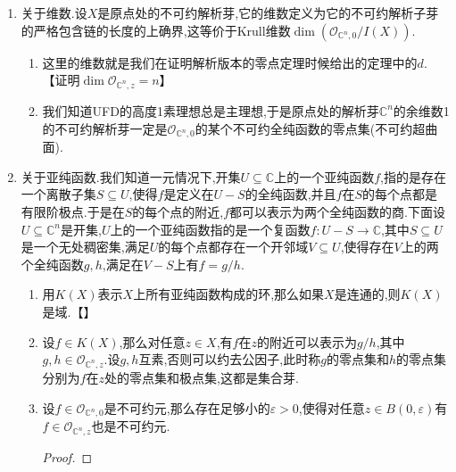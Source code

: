 \begin{enumerate}
\begin{proof}
    	\qquad
    	
    	任取$f\in I(Z(\mathfrak{p}))$,我们要证明的是$f\in\mathfrak{p}$.按照上面提到的定理,在适当选取坐标之后(换句话讲在做一个全纯等价之后),可以要求$f$在$\mathscr{O}_{\mathbb{C}^n,0}/\mathfrak{p}$中的像$\widetilde{f}$满足一个$\mathscr{O}_{\mathbb{C}^d,0}$系数的不可约首一多项式$\widetilde{f}^k+a_1(w)\widetilde{f}^{k-1}+\cdots+a_k(w)=0$,其中$w=(z_{n-d+1},\cdots,z_n)$.由于$f$在$Z(\mathfrak{p})$上处处取零,于是这里$a_k(w)$也在$Z(\mathfrak{p})$上处处取零,但是按照上面定理有$Z(\mathfrak{p})\to\mathbb{C}^d$是芽的满射,所以在原点足够小的附近有$a_k(w)\equiv0$.在$k\ge2$时这件事和$\widetilde{f}$满足不可约首一多项式矛盾,所以只能有$k=1$,也即$\widetilde{f}=0$,也即$f\in\mathfrak{p}$.
    \end{proof}
    \item 关于维数.设$X$是原点处的不可约解析芽,它的维数定义为它的不可约解析子芽的严格包含链的长度的上确界,这等价于Krull维数$\dim(\mathscr{O}_{\mathbb{C}^n,0}/I(X))$.
    \begin{enumerate}[(1)]
    	\item 这里的维数就是我们在证明解析版本的零点定理时候给出的定理中的$d$.【证明$\dim\mathscr{O}_{\mathbb{C}^n,z}=n$】
    	\item 我们知道UFD的高度1素理想总是主理想,于是原点处的解析芽$\mathbb{C}^n$的余维数1的不可约解析芽一定是$\mathscr{O}_{\mathbb{C}^n,0}$的某个不可约全纯函数的零点集(不可约超曲面).
    \end{enumerate}
    \item 关于亚纯函数.我们知道一元情况下,开集$U\subseteq\mathbb{C}$上的一个亚纯函数$f$,指的是存在一个离散子集$S\subseteq U$,使得$f$是定义在$U-S$的全纯函数,并且$f$在$S$的每个点都是有限阶极点.于是在$S$的每个点的附近,$f$都可以表示为两个全纯函数的商.下面设$U\subseteq\mathbb{C}^n$是开集,$U$上的一个亚纯函数指的是一个复函数$f:U-S\to\mathbb{C}$,其中$S\subseteq U$是一个无处稠密集,满足$U$的每个点都存在一个开邻域$V\subseteq U$,使得存在$V$上的两个全纯函数$g,h$,满足在$V-S$上有$f=g/h$.
    \begin{enumerate}[(1)]
    	\item 用$K(X)$表示$X$上所有亚纯函数构成的环,那么如果$X$是连通的,则$K(X)$是域.【】
    	\item 设$f\in K(X)$,那么对任意$z\in X$,有$f$在$z$的附近可以表示为$g/h$,其中$g,h\in\mathscr{O}_{\mathbb{C}^n,z}$.设$g,h$互素,否则可以约去公因子,此时称$g$的零点集和$h$的零点集分别为$f$在$z$处的零点集和极点集,这都是集合芽.
    	\item 设$f\in\mathscr{O}_{\mathbb{C}^n,0}$是不可约元,那么存在足够小的$\varepsilon>0$,使得对任意$z\in B(0,\varepsilon)$有$f\in\mathscr{O}_{\mathbb{C}^n,z}$也是不可约元.
    	\begin{proof}
    		

\end{proof}
\end{enumerate}
\end{enumerate}
